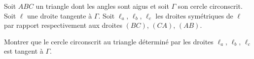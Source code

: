 Soit $ABC$ un triangle dont les angles sont aigus et soit $\Gamma$ son cercle circonscrit. Soit $\ell$ une
droite tangente à $\Gamma$. Soit $\ell_a$, $\ell_b$, $\ell_c$ les droites symétriques de $\ell$ par rapport
respectivement aux droites $(BC)$, $(CA)$, $(AB)$.

Montrer que le cercle circonscrit au triangle déterminé par les droites $\ell_a$, $\ell_b$, $\ell_c$ est
tangent à $\Gamma$.
